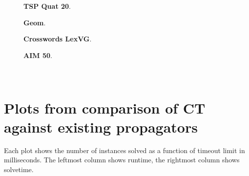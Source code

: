 \documentclass[a4paper,11pt]{article}
\numberwithin{equation}{section}
\begin{document}
\begin{figure}
  \begin{minipage}[b][8cm][s]{0.45\textwidth}
    \centering
    \vfill
    \begin{tikzpicture}[scale=0.8]
      
    \end{tikzpicture}
    \vfill
    \caption{\textbf{TSP Quat 20}.}
    \vspace{\baselineskip}
  \end{minipage}\qquad
  \begin{minipage}[b][8cm][s]{0.45\textwidth}
    \centering
    \vfill
    \begin{tikzpicture}[scale=0.8]
      
    \end{tikzpicture}
    \vfill
    \caption{\textbf{Geom}.}
    \vspace{\baselineskip}
  \end{minipage}\qquad
  \begin{minipage}[b][8cm][s]{0.45\textwidth}
    \centering
    \vfill
    \begin{tikzpicture}[scale=0.8]
      
    \end{tikzpicture}
    \vfill
    \caption{\textbf{Crosswords LexVG}.}
    \vspace{\baselineskip}
  \end{minipage} \qquad
    \begin{minipage}[b][8cm][s]{0.45\textwidth}
    \centering
    \vfill
    \begin{tikzpicture}[scale=0.8]
      
    \end{tikzpicture}
    \vfill
    \caption{\textbf{AIM 50}.}
    \vspace{\baselineskip}
  \end{minipage} \qquad
  
\end{figure}

\clearpage

\section{\\Plots from comparison of CT against existing propagators}
\label{app:compare-gecode}

Each plot shows the number of instances solved as a function
of timeout limit in milliseconds. The leftmost column shows runtime,
the rightmost column shows solvetime.


\end{document}
